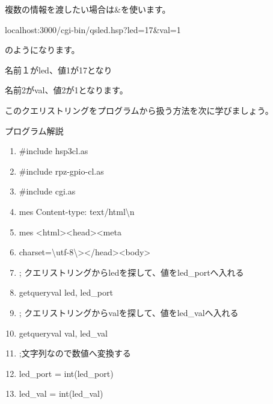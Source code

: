\documentclass[a4paper,12pt,dvipdfmx]{jarticle}
\begin{document}
複数の情報を渡したい場合は\&を使います。

localhost:3000/cgi-bin/qsled.hsp?led=17\&val=1

のようになります。

名前１がled、値1が17となり

名前2がval、値2が1となります。

このクエリストリングをプログラムから扱う方法を次に学びましょう。

\clearpage
プログラム解説



\centering
\begin{boxedminipage}{16.538cm}
	\begin{enumerate}
	\baselineskip 10pt
	\setlength{\itemsep}{0cm}
	\item\#include {\textquotedbl}hsp3cl.as{\textquotedbl}

	\item\#include {\textquotedbl}rpz-gpio-cl.as{\textquotedbl}

	\item\#include {\textquotedbl}cgi.as{\textquotedbl}

	\item mes {\textquotedbl}Content-type: text/html{\textbackslash}n{\textquotedbl}

	\item mes {\textquotedbl}{\textless}html{\textgreater}{\textless}head{\textgreater}{\textless}meta
	\item charset={\textbackslash}{\textquotedbl}utf-8{\textbackslash}{\textquotedbl}{\textgreater}{\textless}/head{\textgreater}{\textless}body{\textgreater}{\textquotedbl}

	\item; クエリストリングからledを探して、値をled\_portへ入れる

	\item getqueryval {\textquotedbl}led{\textquotedbl}, led\_port

	\item ; クエリストリングからvalを探して、値をled\_valへ入れる

	\item getqueryval {\textquotedbl}val{\textquotedbl}, led\_val

	\item ;文字列なので数値へ変換する

	\item led\_port = int(led\_port)

	\item led\_val = int(led\_val)



\end{enumerate}
\end{boxedminipage}
\end{document}
